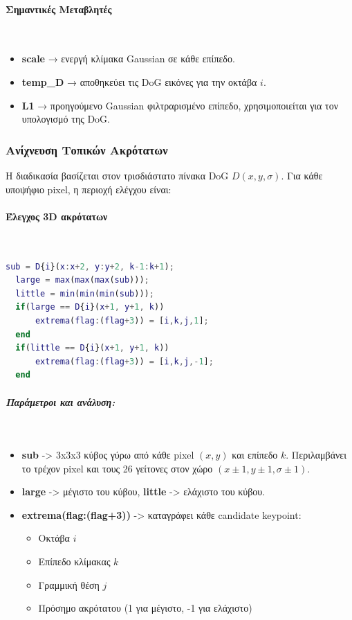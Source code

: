 \documentclass[12pt]{article}
\begin{document}
\paragraph{Σημαντικές Μεταβλητές}
\mbox{}\\
\begin{itemize}
  \item \textbf{scale} → ενεργή κλίμακα Gaussian σε κάθε επίπεδο.
  \item \textbf{temp\_D} → αποθηκεύει τις DoG εικόνες για την οκτάβα $i$.
  \item \textbf{L1} → προηγούμενο Gaussian φιλτραρισμένο επίπεδο, χρησιμοποιείται για τον υπολογισμό της DoG.
\end{itemize}


\subsubsection{Ανίχνευση Τοπικών Ακρότατων}
Η διαδικασία βασίζεται στον τρισδιάστατο πίνακα DoG $D(x,y,\sigma)$. Για κάθε υποψήφιο pixel, η περιοχή ελέγχου είναι:


\paragraph{Έλεγχος 3D ακρότατων}
\mbox{}\\
\begin{lstlisting}[language=Matlab]
  sub = D{i}(x:x+2, y:y+2, k-1:k+1);
  large = max(max(max(sub)));
  little = min(min(min(sub)));
  if(large == D{i}(x+1, y+1, k))
      extrema(flag:(flag+3)) = [i,k,j,1]; 
  end
  if(little == D{i}(x+1, y+1, k))
      extrema(flag:(flag+3)) = [i,k,j,-1]; 
  end
  \end{lstlisting}
  
  \subparagraph{Παράμετροι και ανάλυση:}
  \mbox{}\\
  \begin{itemize}
      \item \textbf{sub} -> 3x3x3 κύβος γύρω από κάθε pixel $(x, y)$ και επίπεδο $k$. Περιλαμβάνει το τρέχον pixel και τους 26 γείτονες στον χώρο $(x \pm 1, y \pm 1, \sigma \pm 1)$.
      \item \textbf{large} -> μέγιστο του κύβου, \textbf{little} -> ελάχιστο του κύβου.
      \item \textbf{extrema(flag:(flag+3))} -> καταγράφει κάθε candidate keypoint:
          \begin{itemize}
              \item Οκτάβα $i$
              \item Επίπεδο κλίμακας $k$
              \item Γραμμική θέση $j$
              \item Πρόσημο ακρότατου (1 για μέγιστο, -1 για ελάχιστο)
          \end{itemize}
  \end{itemize}
  
\end{document}
